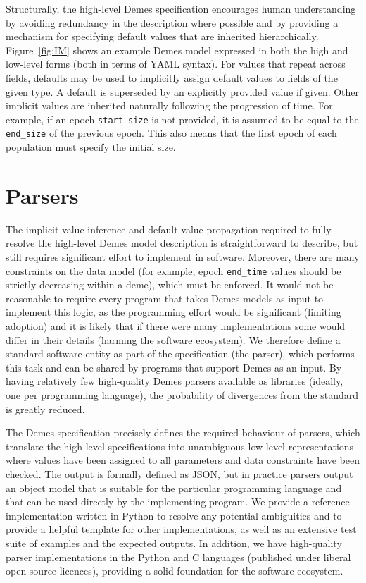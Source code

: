 \documentclass[11pt]{article}
\begin{document}
Structurally, the high-level Demes specification encourages human understanding
by avoiding redundancy in the description where possible and by providing a
mechanism for specifying default values that are inherited hierarchically.
Figure~\ref{fig:IM} shows an example Demes model expressed in both the
high and low-level forms (both in terms of YAML syntax). For values that repeat
across fields, defaults may be used to implicitly assign default values to
fields of the given type.  A default is superseded by an explicitly provided
value if given. Other implicit values are inherited naturally following the
progression of time. For example, if an epoch \texttt{start\_size} is not
provided, it is assumed to be equal to the \texttt{end\_size} of the previous
epoch. This also means that the first epoch of each population must specify the
initial size.

\section{Parsers}\label{sec:appendix-parsers}

The implicit value inference and default value propagation required to
fully resolve the high-level Demes model description is straightforward
to describe, but still requires significant effort to implement in
software. Moreover, there are many constraints on the data model
(for example, epoch \texttt{end\_time} values should be strictly decreasing
within a deme), which must be enforced.
It would not be reasonable to require every program that
takes Demes models as input to implement this logic, as the programming
effort would be significant (limiting adoption)
and it is likely that if there were many implementations some would differ
in their details (harming the software ecosystem).
We therefore define
a standard software entity as part of the specification (the parser),
which performs this task and can be shared by programs that
support Demes as an input. By having relatively few high-quality Demes
parsers available as libraries (ideally, one per programming language),
the probability of divergences from the standard is greatly reduced.

The Demes specification precisely defines the required behaviour of parsers,
which translate the high-level specifications into unambiguous low-level
representations where values have been assigned to all parameters and data
constraints have been checked. The output is formally defined as JSON, but in
practice parsers output an object model that is suitable for the particular
programming language and that can be used directly by the implementing program.
We provide a reference implementation written in Python to resolve any
potential ambiguities and to provide a helpful template for other
implementations, as well as an extensive test suite of examples and the
expected outputs. In addition, we have high-quality parser implementations in
the Python and C languages (published under liberal open source licences),
providing a solid foundation for the software ecosystem.
\end{document}
